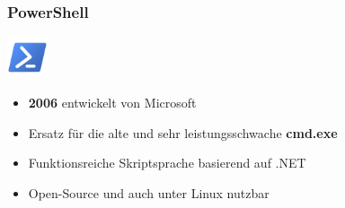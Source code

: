 \begin{frame}
    \frametitle{PowerShell}
    \includegraphics[height=1.2cm]{res/powershell.png}
    \begin{itemize}
        \item \textbf{2006} entwickelt von Microsoft
        \item Ersatz für die alte und sehr leistungsschwache \textbf{cmd.exe}
        \item Funktionsreiche Skriptsprache basierend auf .NET
        \item Open-Source und auch unter Linux nutzbar
    \end{itemize}
\end{frame}
